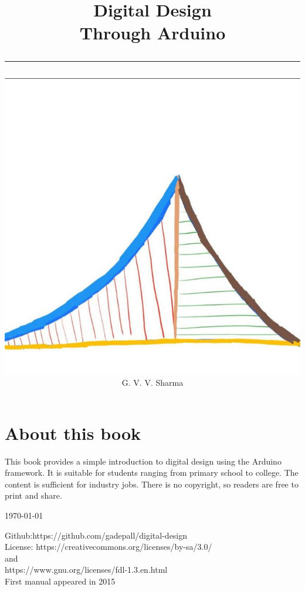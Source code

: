 \documentclass[journal]{IEEEtran}
\begin{document}

\onecolumn


\title{
	\begin{flushleft}
Digital Design \\ {Through Arduino}
	\\
\rule{0.4\columnwidth}{0.4pt}
\end{flushleft}
}
\author{
\vspace{7cm}
	\begin{flushleft}
\includegraphics[width=0.2\columnwidth]{figs/logo.jpg}
\\
		{	\huge G. V. V. Sharma}
	\end{flushleft}
}
\maketitle

\newpage

\section*{About this book}
This book provides a simple introduction to digital design using the Arduino framework.  It is suitable for students ranging from primary school to college.  The content is sufficient for  industry jobs.
There is no copyright, so readers are free to print and share.
\begin{flushright}
	\today
\end{flushright}
Github:https://github.com/gadepall/digital-design
\\
License: https://creativecommons.org/licenses/by-sa/3.0/
\\
and
\\
https://www.gnu.org/licenses/fdl-1.3.en.html
\\
First manual appeared in 2015
\newpage
\tableofcontents

\newpage
\twocolumn

\end{document}
